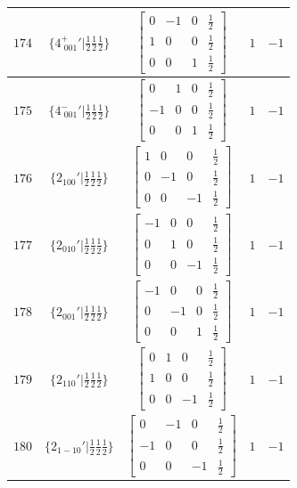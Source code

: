 \documentclass[fleqn,8pt]{jsarticle}
\begin{document}
\begin{longtable}{ccccc}
$ 174 $ & $ \{4^{+}_{\,\,001}{}'|\frac{1}{2} \frac{1}{2} \frac{1}{2}\} $ & $ \begin{bmatrix} 0 & -1 & 0 & \frac{1}{2} \\ 1 & 0 & 0 & \frac{1}{2} \\ 0 & 0 & 1 & \frac{1}{2} \end{bmatrix} $ & $ 1 $ & $ -1 $ \\ \hline
$ 175 $ & $ \{4^{-}_{\,\,001}{}'|\frac{1}{2} \frac{1}{2} \frac{1}{2}\} $ & $ \begin{bmatrix} 0 & 1 & 0 & \frac{1}{2} \\ -1 & 0 & 0 & \frac{1}{2} \\ 0 & 0 & 1 & \frac{1}{2} \end{bmatrix} $ & $ 1 $ & $ -1 $ \\ \hline
$ 176 $ & $ \{2{}_{100}{}'|\frac{1}{2} \frac{1}{2} \frac{1}{2}\} $ & $ \begin{bmatrix} 1 & 0 & 0 & \frac{1}{2} \\ 0 & -1 & 0 & \frac{1}{2} \\ 0 & 0 & -1 & \frac{1}{2} \end{bmatrix} $ & $ 1 $ & $ -1 $ \\ \hline
$ 177 $ & $ \{2{}_{010}{}'|\frac{1}{2} \frac{1}{2} \frac{1}{2}\} $ & $ \begin{bmatrix} -1 & 0 & 0 & \frac{1}{2} \\ 0 & 1 & 0 & \frac{1}{2} \\ 0 & 0 & -1 & \frac{1}{2} \end{bmatrix} $ & $ 1 $ & $ -1 $ \\ \hline
$ 178 $ & $ \{2{}_{001}{}'|\frac{1}{2} \frac{1}{2} \frac{1}{2}\} $ & $ \begin{bmatrix} -1 & 0 & 0 & \frac{1}{2} \\ 0 & -1 & 0 & \frac{1}{2} \\ 0 & 0 & 1 & \frac{1}{2} \end{bmatrix} $ & $ 1 $ & $ -1 $ \\ \hline
$ 179 $ & $ \{2{}_{110}{}'|\frac{1}{2} \frac{1}{2} \frac{1}{2}\} $ & $ \begin{bmatrix} 0 & 1 & 0 & \frac{1}{2} \\ 1 & 0 & 0 & \frac{1}{2} \\ 0 & 0 & -1 & \frac{1}{2} \end{bmatrix} $ & $ 1 $ & $ -1 $ \\ \hline
$ 180 $ & $ \{2{}_{1-10}{}'|\frac{1}{2} \frac{1}{2} \frac{1}{2}\} $ & $ \begin{bmatrix} 0 & -1 & 0 & \frac{1}{2} \\ -1 & 0 & 0 & \frac{1}{2} \\ 0 & 0 & -1 & \frac{1}{2} \end{bmatrix} $ & $ 1 $ & $ -1 $ \\ \hline

\end{longtable}
\end{document}
